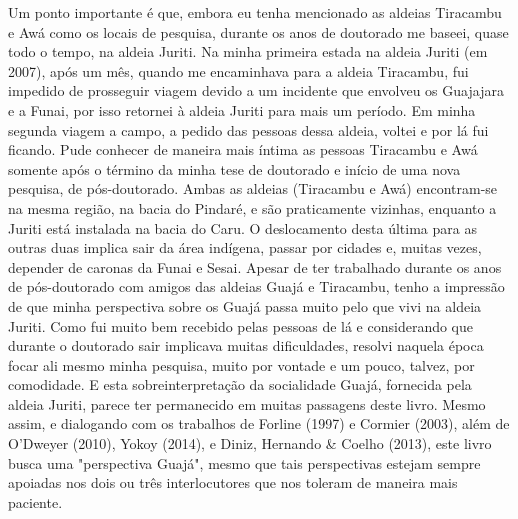 Um ponto importante é que, embora eu tenha mencionado as aldeias
Tiracambu e Awá como os locais de pesquisa, durante os anos de doutorado
me baseei, quase todo o tempo, na aldeia Juriti. Na minha primeira
estada na aldeia Juriti (em 2007), após um mês, quando me encaminhava
para a aldeia Tiracambu, fui impedido de prosseguir viagem devido a um
incidente que envolveu os Guajajara e a Funai, por isso retornei à
aldeia Juriti para mais um período. Em minha segunda viagem a campo, a
pedido das pessoas dessa aldeia, voltei e por lá fui ficando.
Pude conhecer de maneira mais íntima as pessoas Tiracambu e Awá somente
após o término da minha tese de doutorado e início de uma nova pesquisa,
de pós-doutorado. Ambas as aldeias (Tiracambu e Awá) encontram-se na
mesma região, na bacia do Pindaré, e são praticamente vizinhas, enquanto
a Juriti está instalada na bacia do Caru. O deslocamento desta última
para as outras duas implica sair da área indígena, passar por cidades e,
muitas vezes, depender de caronas da Funai e Sesai. Apesar de ter
trabalhado durante os anos de pós-doutorado com amigos das aldeias Guajá
e Tiracambu, tenho a impressão de que minha perspectiva sobre os Guajá
passa muito pelo que vivi na aldeia Juriti. Como fui muito bem recebido
pelas pessoas de lá e considerando que durante o doutorado sair
implicava muitas dificuldades, resolvi naquela época focar ali mesmo
minha pesquisa, muito por vontade e um pouco, talvez, por comodidade. E
esta sobreinterpretação da socialidade Guajá, fornecida pela aldeia
Juriti, parece ter permanecido em muitas passagens deste livro. Mesmo
assim, e dialogando com os trabalhos de Forline (1997) e Cormier (2003),
além de O'Dweyer (2010), Yokoy (2014), e Diniz, Hernando \& Coelho
(2013), este livro busca uma "perspectiva Guajá", mesmo que tais
perspectivas estejam sempre apoiadas nos dois ou três interlocutores que
nos toleram de maneira mais paciente.

